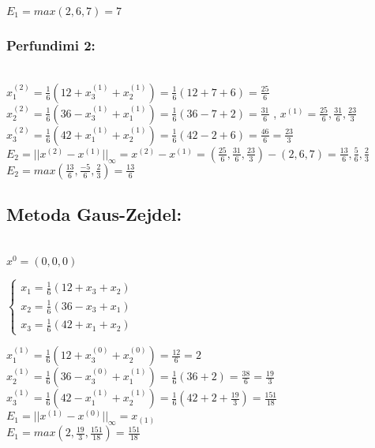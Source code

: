 \documentclass{article}
\begin{document}
$E_1 = max (2,6,7) = 7$\\

\subsubsection{Perfundimi 2:}\\

$x_1^{(2)} = \frac{1}{6} (12 + x_3^{(1)} + x_2^{(1)} )= \frac{1}{6} (12+7+6)=\frac{25}{6}$\\

$x_2^{(2)} = \frac{1}{6} (36 - x_3^{(1)} + x_1^{(1)} )= \frac{1}{6} (36-7+2) = \frac{31}{6} $  , $x^{(1)}= \frac{25}{6} , \frac{31}{6} , \frac{23}{3}$\\


$x_3^{(2)} = \frac{1}{6} (42+ x_1^{(1)} + x_2^{(1)} )= \frac{1}{6} (42-2+6)=\frac{46}{6} = \frac{23}{3}$\\


$E_2=||x^{(2)} - x^{(1)} ||_{\infty} =x^{(2)} - x^{(1)} = (\frac{25}{6} , \frac{31}{6} , \frac{23}{3}) - (2,6,7)= \frac{13}{6} ,\frac{5}{6} ,\frac{2}{3}$\\


$E_2= max(\frac{13}{6},\frac{- 5}{6} , \frac{2}{3}) =  \frac{13}{6}$\\


\subsection{Metoda Gaus-Zejdel:}\\

$x^{0} = (0,0,0)$\\


\begin{center}
    $\begin{cases} x_1 = \frac{1}{6} (12 + x_3 + x_2)\\ x_2 = \frac{1}{6} (36 - x_3 + x_1) \\ x_3= \frac{1}{6} (42 + x_1 + x_2) \end{cases}$\\
    

\end{center}



$x_1^{(1)} = \frac{1}{6} (12 + x_3^{(0)} + x_2^{(0)} )= \frac{12}{6} = 2$\\
$x_2^{(1)} = \frac{1}{6} (36 - x_3^{(0)} + x_1^{(1)} )= \frac{1}{6} (36+2)= \frac{38}{6} = \frac{19}{3}$\\
$x_3^{(1)} = \frac{1}{6} (42 - x_1^{(1)} + x_2^{(1)} )= \frac{1}{6} (42+2+\frac{19}{3})= \frac{151}{18}$\\



$E_1 = || x^{(1)} - x^{(0)} ||_{\infty} = x_{(1)} $\\
$E_1 = max(2, \frac{19}{3}, \frac{151}{18}) = \frac{151}{18}$
\end{document}

